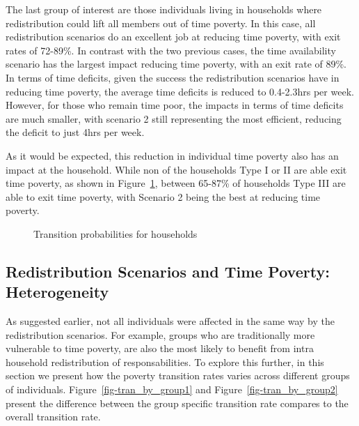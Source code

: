 \documentclass[
  11pt,
]{article}
\begin{document}
The last group of interest are those individuals living in households
where redistribution could lift all members out of time poverty. In this
case, all redistribution scenarios do an excellent job at reducing time
poverty, with exit rates of 72-89\%. In contrast with the two previous
cases, the time availability scenario has the largest impact reducing
time poverty, with an exit rate of 89\%. In terms of time deficits,
given the success the redistribution scenarios have in reducing time
poverty, the average time deficits is reduced to 0.4-2.3hrs per week.
However, for those who remain time poor, the impacts in terms of time
deficits are much smaller, with scenario 2 still representing the most
efficient, reducing the deficit to just 4hrs per week.

As it would be expected, this reduction in individual time poverty also
has an impact at the household. While non of the households Type I or II
are able exit time poverty, as shown in Figure~\ref{fig-transition2},
between 65-87\% of households Type III are able to exit time poverty,
with Scenario 2 being the best at reducing time poverty.

\begin{figure}[H]


\caption{\label{fig-transition2}Transition probabilities for households}

\end{figure}%

\subsection{Redistribution Scenarios and Time Poverty:
Heterogeneity}\label{redistribution-scenarios-and-time-poverty-heterogeneity}

As suggested earlier, not all individuals were affected in the same way
by the redistribution scenarios. For example, groups who are
traditionally more vulnerable to time poverty, are also the most likely
to benefit from intra household redistribution of responsabilities. To
explore this further, in this section we present how the poverty
transition rates varies across different groups of individuals.
Figure~\ref{fig-tran_by_group1} and Figure~\ref{fig-tran_by_group2}
present the difference between the group specific transition rate
compares to the overall transition rate.
\end{document}

